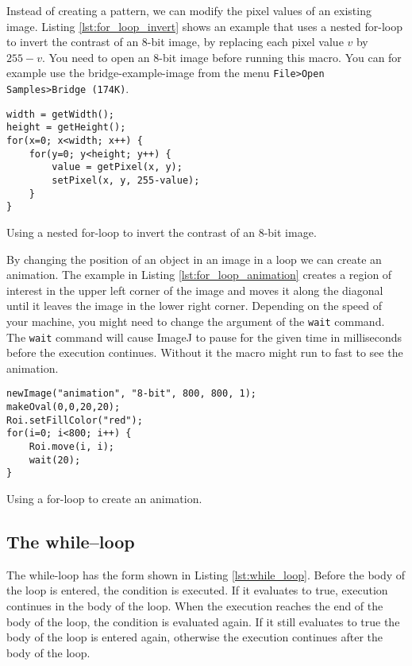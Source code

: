 Instead of creating a pattern, we can modify the pixel values of an existing image. Listing \ref{lst:for_loop_invert} shows an example that uses a nested for-loop to invert the contrast of an 8-bit image, by replacing each pixel value $v$ by $255-v$. You need to open an 8-bit image before running this macro. You can for example use the bridge-example-image from the menu {\tt File>Open Samples>Bridge (174K)}.

\begin{listing}[H]
\begin{verbatim}
width = getWidth();
height = getHeight();
for(x=0; x<width; x++) {
    for(y=0; y<height; y++) {
    	value = getPixel(x, y);
    	setPixel(x, y, 255-value);
    }
}
\end{verbatim}
\caption{Using a nested for-loop to invert the contrast of an 8-bit image.}
\label{lst:for_loop_invert}
\end{listing}

By changing the position of an object in an image in a loop we can create an animation. The example in Listing \ref{lst:for_loop_animation} creates a region of interest in the upper left corner of the image and moves it along the diagonal until it leaves the image in the lower right corner. Depending on the speed of your machine, you might need to change the argument of the {\tt wait} command. The {\tt wait} command will cause ImageJ to pause for the given time in milliseconds before the execution continues. Without it the macro might run to fast to see the animation. 

\begin{listing}[H]
\begin{verbatim}
newImage("animation", "8-bit", 800, 800, 1);
makeOval(0,0,20,20);
Roi.setFillColor("red");	
for(i=0; i<800; i++) {
	Roi.move(i, i);
	wait(20);
}
\end{verbatim}
\caption{Using a for-loop to create an animation.}
\label{lst:for_loop_animation}
\end{listing}

\subsection{The while--loop}

The while-loop has the form shown in Listing \ref{lst:while_loop}. Before the body of the loop is entered, the condition is executed. If it evaluates to true, execution continues in the body of the loop. When the execution reaches the end of the body of the loop, the condition is evaluated again. If it still evaluates to true the body of the loop is entered again, otherwise the execution continues after the body of the loop.

